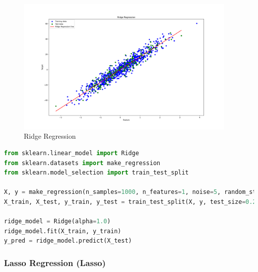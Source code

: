 \begin{figure}[H]
	\centering
	\includegraphics[width=0.95\textwidth]{./Images/Ridge-Regression.png}
	\caption{Ridge Regression}
	\label{fig:ridge-regression}
\end{figure}

\begin{lstlisting}[language=Python, caption=Ridge Regression Example]
from sklearn.linear_model import Ridge
from sklearn.datasets import make_regression
from sklearn.model_selection import train_test_split

X, y = make_regression(n_samples=1000, n_features=1, noise=5, random_state=42)
X_train, X_test, y_train, y_test = train_test_split(X, y, test_size=0.2, random_state=42)

ridge_model = Ridge(alpha=1.0)
ridge_model.fit(X_train, y_train)
y_pred = ridge_model.predict(X_test)
\end{lstlisting}

\subsubsection*{Lasso Regression (Lasso)}

